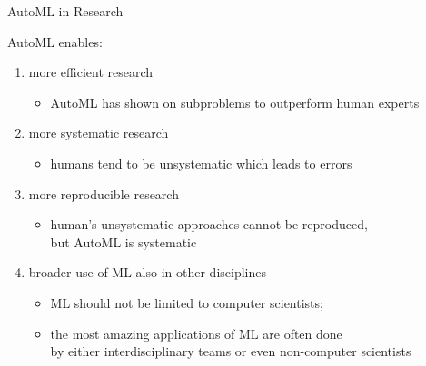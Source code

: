 \begin{frame}[c]{AutoML in Research}

AutoML enables:

\begin{enumerate}
  \item more efficient research
  \begin{itemize}
    \item AutoML has shown on subproblems to outperform human experts
  \end{itemize}
  \pause
  \smallskip
  \item more systematic research
  \begin{itemize}
    \item humans tend to be unsystematic which leads to errors
  \end{itemize}
  \smallskip
  \pause
  \item more reproducible research
  \begin{itemize}
    \item human's unsystematic approaches cannot be reproduced,\\ but AutoML is systematic
  \end{itemize}
  \pause
  \item broader use of ML also in other disciplines
  \begin{itemize}
    \item ML should not be limited to computer scientists;
    \item the most amazing applications of ML are often done\\ by either interdisciplinary teams or even non-computer scientists
  \end{itemize}
\end{enumerate}

\end{frame}
